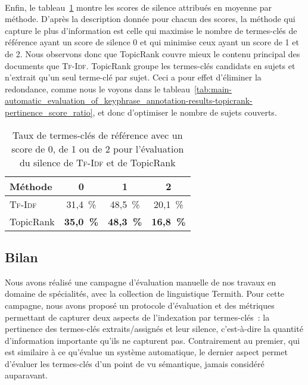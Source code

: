         ~\\Enfin, le
        tableau~\ref{tab:main-automatic_evaluation_of_keyphrase_annotation-results-topicrank-silence_score_ratio}
        montre les scores de silence attribués en moyenne par méthode. D'après
        la description donnée pour chacun des scores, la méthode qui capture le
        plus d'information est celle qui maximise le nombre de termes-clés de
        référence ayant un score de silence 0 et qui minimise ceux ayant un
        score de 1 et de 2. Nous observons donc que TopicRank couvre mieux le
        contenu principal des documents que \textsc{Tf-Idf}. TopicRank groupe
        les termes-clés candidats en sujets et n'extrait qu'un seul terme-clé
        par sujet. Ceci a pour effet d'éliminer la redondance, comme nous le
        voyons dans le
        tableau~\ref{tab:main-automatic_evaluation_of_keyphrase_annotation-results-topicrank-pertinence_score_ratio},
        et donc d'optimiser le nombre de sujets couverts.
        \begin{table}[h!]
          \centering
          \begin{tabular}{l|c|c|c}
            \toprule
            \textbf{Méthode} & \textbf{0} & \textbf{1} & \textbf{2}\\
            \hline
            \textsc{Tf-Idf} & 31,4~\% & 48,5~\% & 20,1~\%\\
            TopicRank & \textbf{35,0~\%} & \textbf{48,3~\%} & \textbf{16,8~\%}\\
            \bottomrule
          \end{tabular}
          \caption{Taux de termes-clés de référence avec un score de 0, de 1 ou
                   de 2 pour l'évaluation du silence de \textsc{Tf-Idf} et de
                   TopicRank
                   \label{tab:main-automatic_evaluation_of_keyphrase_annotation-results-topicrank-silence_score_ratio}}
        \end{table}


    \subsection{Bilan}
    \label{subsec:main-domain_specific_keyphrase_annotation-manual_evaluation-conclusion}
      Nous avons réalisé une campagne d'évaluation manuelle de nos travaux en
      domaine de spécialités, avec la collection de linguistique Termith. Pour
      cette campagne, nous avons proposé un protocole d'évaluation et des
      métriques permettant de capturer deux aspects de l'indexation par
      termes-clés~: la pertinence des termes-clés extraits/assignés et leur
      silence, c'est-à-dire la quantité d'information importante qu'ils ne
      capturent pas. Contrairement au premier, qui est similaire à ce qu'évalue
      un système automatique, le dernier aspect permet d'évaluer les termes-clés
      d'un point de vu sémantique, jamais considéré auparavant.

